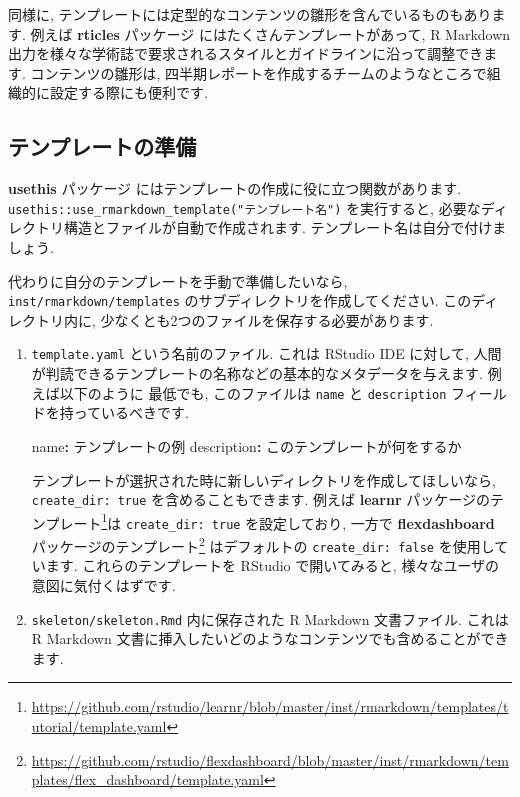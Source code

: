 \documentclass[
  11pt,
  lualatex,ja=standard,jafont=noto]{bxjsreport}
\newenvironment{Shaded}{\begin{snugshade}}{\end{snugshade}}
\newcommand{\AttributeTok}[1]{\textcolor[rgb]{0.77,0.63,0.00}{#1}}
\newcommand{\FunctionTok}[1]{\textcolor[rgb]{0.00,0.00,0.00}{#1}}
\newcommand{\KeywordTok}[1]{\textcolor[rgb]{0.13,0.29,0.53}{\textbf{#1}}}
\renewcommand{\href}[2]{#2\footnote{\url{#1}}}
\begin{document}
同様に, テンプレートには定型的なコンテンツの雛形を含んでいるものもあります. 例えば \textbf{rticles} パッケージ \autocite{R-rticles} にはたくさんテンプレートがあって, R Markdown 出力を様々な学術誌で要求されるスタイルとガイドラインに沿って調整できます. コンテンツの雛形は, 四半期レポートを作成するチームのようなところで組織的に設定する際にも便利です.

\hypertarget{ux30c6ux30f3ux30d7ux30ecux30fcux30c8ux306eux6e96ux5099}{%
\subsection{テンプレートの準備}\label{ux30c6ux30f3ux30d7ux30ecux30fcux30c8ux306eux6e96ux5099}}

\textbf{usethis} パッケージ \autocite{R-usethis} にはテンプレートの作成に役に立つ関数があります. \texttt{usethis::use\_rmarkdown\_template("テンプレート名")} を実行すると, 必要なディレクトリ構造とファイルが自動で作成されます. テンプレート名は自分で付けましょう.

代わりに自分のテンプレートを手動で準備したいなら, \texttt{inst/rmarkdown/templates} のサブディレクトリを作成してください. このディレクトリ内に, 少なくとも2つのファイルを保存する必要があります.

\begin{enumerate}
\def\labelenumi{\arabic{enumi}.}
\item
  \texttt{template.yaml} という名前のファイル. これは RStudio IDE に対して, 人間が判読できるテンプレートの名称などの基本的なメタデータを与えます. 例えば以下のように 最低でも, このファイルは \texttt{name} と \texttt{description} フィールドを持っているべきです.

\begin{Shaded}
\begin{Highlighting}[]
\FunctionTok{name}\KeywordTok{:}\AttributeTok{ テンプレートの例}
\FunctionTok{description}\KeywordTok{:}\AttributeTok{ このテンプレートが何をするか}
\end{Highlighting}
\end{Shaded}

  テンプレートが選択された時に新しいディレクトリを作成してほしいなら, \texttt{create\_dir: true} を含めることもできます. 例えば \href{https://github.com/rstudio/learnr/blob/master/inst/rmarkdown/templates/tutorial/template.yaml}{\textbf{learnr} パッケージのテンプレート}は \texttt{create\_dir: true} を設定しており, 一方で \href{https://github.com/rstudio/flexdashboard/blob/master/inst/rmarkdown/templates/flex_dashboard/template.yaml}{\textbf{flexdashboard} パッケージのテンプレート} はデフォルトの \texttt{create\_dir: false} を使用しています. これらのテンプレートを RStudio で開いてみると, 様々なユーザの意図に気付くはずです.
\item
  \texttt{skeleton/skeleton.Rmd} 内に保存された R Markdown 文書ファイル. これは R Markdown 文書に挿入したいどのようなコンテンツでも含めることができます.
\end{enumerate}
\end{document}
